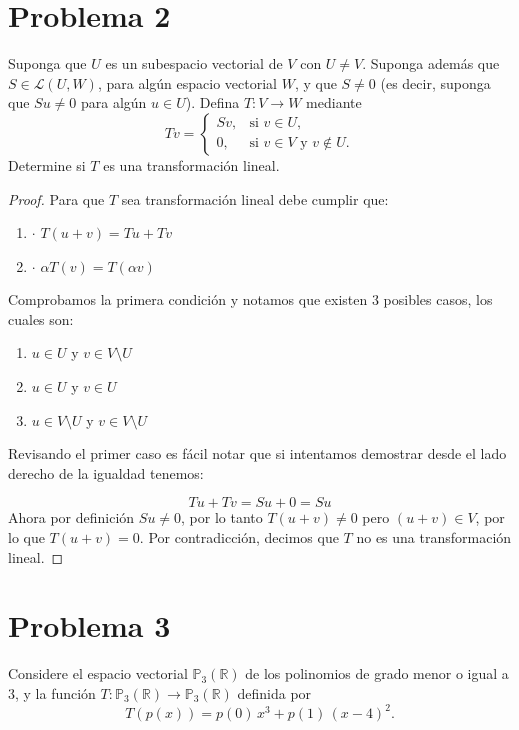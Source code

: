 \documentclass[11pt]{article}
\theoremstyle{definition} %
\newcommand{\R}{\mathbb{R}}
\begin{document}
\section*{Problema 2}
Suponga que \(U\) es un subespacio vectorial de \(V\) con \(U\neq V\). Suponga además que \(S\in\mathcal L(U,W)\), para algún espacio vectorial \(W\), y que \(S\neq 0\) (es decir, suponga que \(Su\neq 0\) para algún \(u\in U\)). Defina \(T:V\to W\) mediante
\[
  Tv=
  \begin{cases}
    Sv, & \text{si } v\in U,\\[4pt]
    0,  & \text{si } v\in V \text{ y } v\not\in U.
  \end{cases}
\]
Determine si \(T\) es una transformación lineal.
\begin{proof}
  Para que $T$ sea transformación lineal debe cumplir que:
\begin{enumerate}
  \item $\cdot$ $T(u + v) = Tu + Tv$
  \item $\cdot$ $\alpha T(v) = T(\alpha v)$
\end{enumerate}
Comprobamos la primera condición y notamos que existen 3 posibles casos, los cuales son:
  \begin{enumerate}
    \item $u \in U$ y $v \in V\setminus U$
    \item $u \in U$ y $v \in U$
    \item $u \in V\setminus U$ y $v \in V\setminus U$
  \end{enumerate}
Revisando el primer caso es fácil notar que si intentamos demostrar desde el lado derecho de la igualdad tenemos:

\[
  Tu + Tv = Su + 0 = Su
\]
Ahora por definición $Su \not= 0$, por lo tanto $T(u+v) \not= 0$ pero $(u+v) \in V$, por lo que $T(u +v ) = 0$. Por contradicción, decimos que $T$ no es una transformación lineal.

\end{proof}
\section*{Problema 3}
Considere el espacio vectorial \(\mathbb{P}_3(\R)\) de los polinomios de grado menor o igual a \(3\), y la función \(T:\mathbb{P}_3(\R)\to \mathbb{P}_3(\R)\) definida por
\[
  T(p(x)) = p(0)\,x^3 + p(1)\,(x-4)^2.
\]
\end{document}
